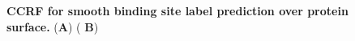 \begin{center}
    \begin{figure}
        \caption[CCRF for smooth binding site label prediction over protein
            surface.]{\textbf{CCRF for smooth binding site label prediction over protein surface.} ({\bf A}) ({\bf
            B}) }
  \label{fig:ccrf}
\end{figure}
\end{center}

